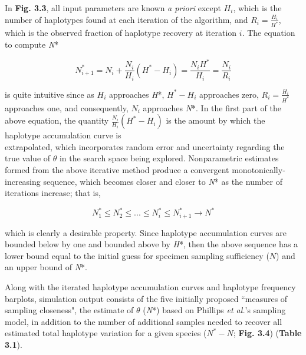 \noindent In \textbf{Fig. 3.3}, all input parameters are known \textit{a priori} except $H_i$, which is the number of haplotypes found at each iteration of the algorithm, and $R_i = \frac{H_i}{H^*}$, which is the observed fraction of haplotype recovery at iteration $i$. The equation to compute \textit{N}*

\begin{equation}
N^*_{i+1} = N_i + \frac{N_i}{H_i}\left(H^* - H_i\right) = \frac{N_iH^*}{H_i} = \frac{N_i}{R_i}
\end{equation}

\vspace{5mm}

\noindent is quite intuitive since as $H_i$ approaches \textit{H}*, $H^*-H_i$ approaches zero, $R_i = \frac{H_i}{H^*}$ approaches one, and consequently, $N_i$ approaches \textit{N}*. In the first part of the above equation, the quantity $\frac{N_i}{H_i}\left(H^* - H_i\right)$ is the amount by which the haplotype accumulation curve is \\ extrapolated, which incorporates random error and uncertainty regarding the true value of $\theta$ in the search space being explored. Nonparametric estimates formed from the above iterative method produce a convergent monotonically-increasing sequence, which becomes closer and closer to \textit{N}* as the number of iterations increase; that is,

\begin{equation}
N^*_1 \leq N^*_2 \leq ... \leq N^*_i \leq N^*_{i+1} \rightarrow N^*
\end{equation} 

\vspace{5mm}

\noindent which is clearly a desirable property. Since haplotype accumulation curves are bounded below by one and bounded above by \textit{H}*, then the above sequence has a lower bound equal to the initial guess for specimen sampling sufficiency ($N$) and an upper bound of \textit{N}*.

Along with the iterated haplotype accumulation curves and haplotype frequency \\ barplots, simulation output consists of the five initially proposed ``measures of sampling closeness", the estimate of $\theta$ (\textit{N}*) based on Phillips \textit{et al.}'s \cite{phillips2015exploration} sampling model, in addition to the number of additional samples needed to recover all estimated total haplotype variation for a given species ($N^*-N$; \textbf{Fig. 3.4}) (\textbf{Table 3.1}). 



